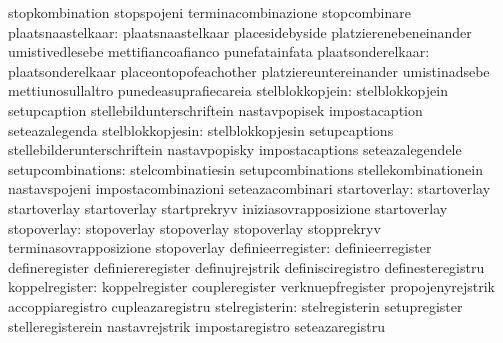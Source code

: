                                   stopkombination                  stopspojeni
                                  terminacombinazione              stopcombinare
               plaatsnaastelkaar: plaatsnaastelkaar                placesidebyside
                                  platzierenebeneinander           umistivedlesebe
                                  mettifiancoafianco               punefatainfata
               plaatsonderelkaar: plaatsonderelkaar                placeontopofeachother
                                  platziereuntereinander           umistinadsebe
                                  mettiunosullaltro                punedeasuprafiecareia
                 stelblokkopjein: stelblokkopjein                  setupcaption
                                  stellebildunterschriftein        nastavpopisek
                                  impostacaption                   seteazalegenda %
                stelblokkopjesin: stelblokkopjesin                 setupcaptions
                                  stellebilderunterschriftein      nastavpopisky
                                  impostacaptions                  seteazalegendele %
               setupcombinations: stelcombinatiesin                setupcombinations
                                  stellekombinationein             nastavspojeni
                                  impostacombinazioni              seteazacombinari
                    startoverlay: startoverlay                     startoverlay
                                  startoverlay                     startprekryv
                                  iniziasovrapposizione            startoverlay
                     stopoverlay: stopoverlay                      stopoverlay
                                  stopoverlay                      stopprekryv
                                  terminasovrapposizione           stopoverlay
               definieerregister: definieerregister                defineregister
                                  definiereregister                definujrejstrik
                                  definisciregistro                definesteregistru
                  koppelregister: koppelregister                   coupleregister
                                  verknuepfregister                propojenyrejstrik
                                  accoppiaregistro                 cupleazaregistru
                  stelregisterin: stelregisterin                   setupregister
                                  stelleregisterein                nastavrejstrik
                                  impostaregistro                  seteazaregistru
